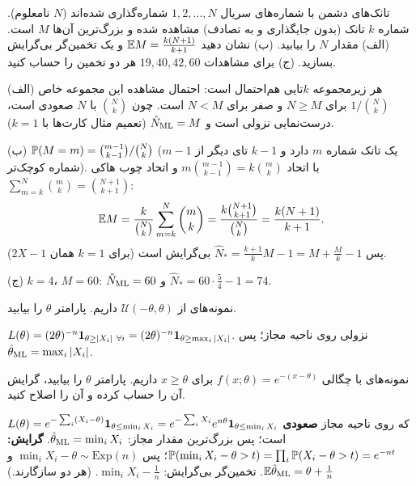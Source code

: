 \begin{exercise}
تانک‌های دشمن با شماره‌های سریال $1,2,\ldots,N$ شماره‌گذاری شده‌اند ($N$ نامعلوم). شماره $k$ تانک (بدون جایگذاری و به تصادف) مشاهده شده و بزرگ‌ترین آن‌ها $M$ است. (الف)  مقدار $N$ را بیابید. (ب) نشان دهید $\mathbb{E} M=\frac{k(N+1)}{k+1}$ و یک تخمین‌گر بی‌گرایش بسازید. (ج) برای مشاهدات $19,40,42,60$ هر دو تخمین را حساب کنید.
\end{exercise}
\begin{solution}
(الف) هر زیرمجموعه $k$تایی هم‌احتمال است: احتمال مشاهده این مجموعه خاص $1/\binom Nk$ برای $N\ge M$ و صفر برای $N<M$ است. چون $\binom Nk$ با $N$ صعودی است، درست‌نمایی نزولی است و $\hat N_{\mathrm{ML}}=M$ (تعمیم مثال کارت‌ها با $k=1$).

(ب) $\mathbb{P}(M=m)=\binom{m-1}{k-1}/\binom Nk$ (یک تانک شماره $m$ دارد و $k-1$ تای دیگر از $m-1$ شماره کوچک‌تر). با اتحاد $m\binom{m-1}{k-1}=k\binom mk$ و اتحاد چوب هاکی $\sum_{m=k}^N\binom mk=\binom{N+1}{k+1}$:
\[
\mathbb{E} M=\frac{k}{\binom Nk}\sum_{m=k}^N\binom mk=\frac{k\binom{N+1}{k+1}}{\binom Nk}=\frac{k(N+1)}{k+1}.
\]
پس $\hat N_*=\frac{k+1}{k}M-1=M+\frac Mk-1$ بی‌گرایش است (برای $k=1$ همان $2X-1$).

(ج) $k=4$، $M=60$: $\hat N_{\mathrm{ML}}=60$ و $\hat N_*=60\cdot\frac54-1=74$.
\end{solution}

\begin{exercise}
نمونه‌های  از $\mathcal U(-\theta,\theta)$ داریم.  پارامتر $\theta$ را بیابید.
\end{exercise}
\begin{solution}
$L(\theta)=(2\theta)^{-n}\ind_{\theta\ge|X_i|\ \forall i}=(2\theta)^{-n}\ind_{\theta\ge\max_i|X_i|}$. نزولی روی ناحیه مجاز؛ پس $\hat\theta_{\mathrm{ML}}=\max_i|X_i|$.
\end{solution}

\begin{exercise}
نمونه‌های  با چگالی $f(x;\theta)=e^{-(x-\theta)}$ برای $x\ge\theta$ داریم.  پارامتر $\theta$ را بیابید، گرایش آن را حساب کرده و آن را اصلاح کنید.
\end{exercise}
\begin{solution}
$L(\theta)=e^{-\sum_i(X_i-\theta)}\mathbf{1}_{\theta\le\min_iX_i}=e^{-\sum_iX_i}e^{n\theta}\mathbf{1}_{\theta\le\min_iX_i}$ که روی ناحیه مجاز \textbf{صعودی} است؛ پس بزرگ‌ترین مقدار مجاز: $\hat\theta_{\mathrm{ML}}=\min_iX_i$.
\textbf{گرایش:} $\mathbb{P}(\min_iX_i-\theta>t)=\prod_i\mathbb{P}(X_i-\theta>t)=e^{-nt}$؛ پس $\min_iX_i-\theta\sim\mathrm{Exp}(n)$ و $\mathbb{E}\hat\theta_{\mathrm{ML}}=\theta+\frac1n$. تخمین‌گر بی‌گرایش: $\min_iX_i-\frac1n$. (هر دو سازگارند.)
\end{solution}


